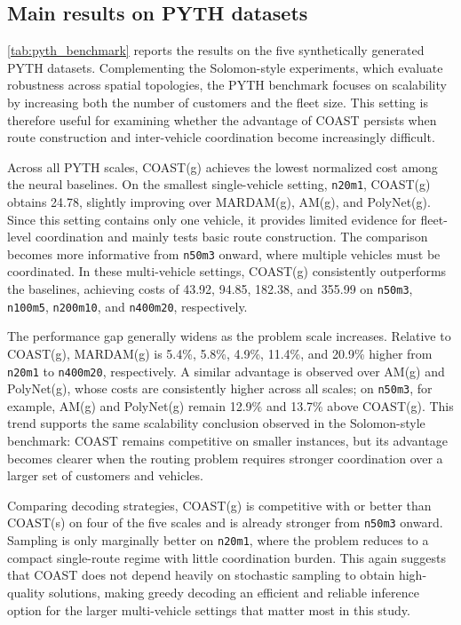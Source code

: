 \documentclass[conference]{IEEEtran}
\begin{document}
\subsection{Main results on PYTH datasets}

\autoref{tab:pyth_benchmark} reports the results on the five synthetically generated PYTH datasets. Complementing the Solomon-style experiments, which evaluate robustness across spatial topologies, the PYTH benchmark focuses on scalability by increasing both the number of customers and the fleet size. This setting is therefore useful for examining whether the advantage of COAST persists when route construction and inter-vehicle coordination become increasingly difficult.

Across all PYTH scales, COAST(g) achieves the lowest normalized cost among the neural baselines. On the smallest single-vehicle setting, \texttt{n20m1}, COAST(g) obtains 24.78, slightly improving over MARDAM(g), AM(g), and PolyNet(g). Since this setting contains only one vehicle, it provides limited evidence for fleet-level coordination and mainly tests basic route construction. The comparison becomes more informative from \texttt{n50m3} onward, where multiple vehicles must be coordinated. In these multi-vehicle settings, COAST(g) consistently outperforms the baselines, achieving costs of 43.92, 94.85, 182.38, and 355.99 on \texttt{n50m3}, \texttt{n100m5}, \texttt{n200m10}, and \texttt{n400m20}, respectively.

The performance gap generally widens as the problem scale increases. Relative to COAST(g), MARDAM(g) is 5.4\%, 5.8\%, 4.9\%, 11.4\%, and 20.9\% higher from \texttt{n20m1} to \texttt{n400m20}, respectively. A similar advantage is observed over AM(g) and PolyNet(g), whose costs are consistently higher across all scales; on \texttt{n50m3}, for example, AM(g) and PolyNet(g) remain 12.9\% and 13.7\% above COAST(g). This trend supports the same scalability conclusion observed in the Solomon-style benchmark: COAST remains competitive on smaller instances, but its advantage becomes clearer when the routing problem requires stronger coordination over a larger set of customers and vehicles.

Comparing decoding strategies, COAST(g) is competitive with or better than COAST(s) on four of the five scales and is already stronger from \texttt{n50m3} onward. Sampling is only marginally better on \texttt{n20m1}, where the problem reduces to a compact single-route regime with little coordination burden. This again suggests that COAST does not depend heavily on stochastic sampling to obtain high-quality solutions, making greedy decoding an efficient and reliable inference option for the larger multi-vehicle settings that matter most in this study.
\end{document}
